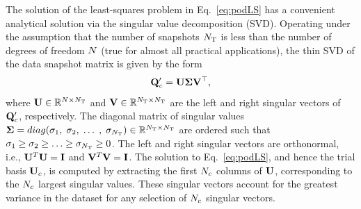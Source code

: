 The solution of the least-squares problem in Eq.~\ref{eq:podLS} has a convenient analytical solution via the singular value decomposition (SVD). Operating under the assumption that the number of snapshots $N_{\text{T}}$ is less than the number of degrees of freedom $N$ (true for almost all practical applications), the thin SVD of the data snapshot matrix is given by the form
\begin{equation}\label{eq:svd}
    \consDataMatUns = \leftEvecMat \singVecMat \rightEvecMat^\top,
\end{equation}
where $\leftEvecMat \inRTwo{\numDOF}{\numSnaps}$ and $\rightEvecMat \inRTwo{\numSnaps}{\numSnaps}$ are the left and right singular vectors of $\consDataMatUns$, respectively. The diagonal matrix of singular values $\boldsymbol{\Sigma} = diag(\sigma_1, \; \sigma_2, \; \hdots \;, \; \sigma_{N_{\text{T}}}) \in \mathbb{R}^{N_{\text{T}} \times N_{\text{T}}}$ are ordered such that $\sigma_1 \geq \sigma_2 \geq \hdots \geq \sigma_{N_{\text{T}}} \geq 0 $. The left and right singular vectors are orthonormal, i.e., $\leftEvecMat^T \leftEvecMat = \identMat$ and $\rightEvecMat^T \rightEvecMat = \identMat$. The solution to Eq.~\ref{eq:podLS}, and hence the trial basis $\consTrial$, is computed by extracting the first $N_c$ columns of $\leftEvecMat$, corresponding to the $N_c$ largest singular values. These singular vectors account for the greatest variance in the dataset for any selection of $N_c$ singular vectors.

